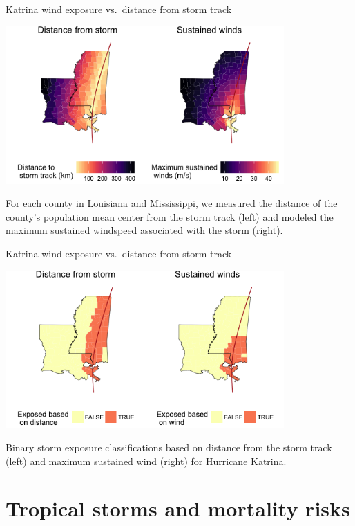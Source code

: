 \documentclass[ignorenonframetext,]{beamer}
\begin{document}
\begin{frame}{Katrina wind exposure vs.~distance from storm track}

\begin{center}\includegraphics[width=0.8\textwidth]{katrina_continuous_exposures} \end{center}

\footnotesize For each county in Louisiana and Mississippi, we measured
the distance of the county's population mean center from the storm track
(left) and modeled the maximum sustained windspeed associated with the
storm (right).

\end{frame}

\begin{frame}{Katrina wind exposure vs.~distance from storm track}

\begin{center}\includegraphics[width=0.8\textwidth]{katrina_exposure_discrete} \end{center}

\footnotesize Binary storm exposure classifications based on distance
from the storm track (left) and maximum sustained wind (right) for
Hurricane Katrina.

\end{frame}

\section{Tropical storms and mortality
risks}\label{tropical-storms-and-mortality-risks}
\end{document}
